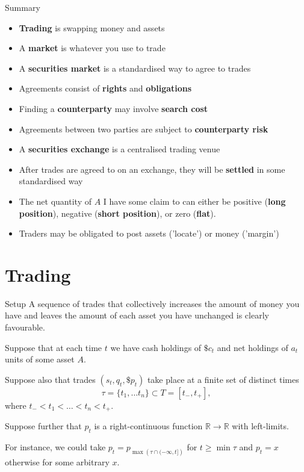 \documentclass{beamer}
\begin{document}
\begin{frame}{Summary}
	\begin{itemize}
		\item \textbf{Trading} is swapping money and assets
		\item A \textbf{market} is whatever you use to trade
		\item A \textbf{securities market} is a standardised way to agree to trades
		\item Agreements consist of \textbf{rights} and \textbf{obligations}
		\item Finding a \textbf{counterparty} may involve \textbf{search cost}
		\item Agreements between two parties are subject to \textbf{counterparty risk}
		\item A \textbf{securities exchange} is a centralised trading venue %
		\item After trades are agreed to on an exchange, they will be \textbf{settled} in some standardised way
		\item The net quantity of $A$ I have some claim to can either be positive (\textbf{long position}), negative (\textbf{short position}), or zero (\textbf{flat}).
		\item Traders may be obligated to post assets ('locate') or money ('margin')
	\end{itemize}
\end{frame}

\section{Trading}
\begin{frame}{Setup}
	A sequence of trades that collectively increases the amount of money you have and leaves the amount of each asset you have unchanged is clearly favourable.

	\pause

	Suppose that at each time $t$ we have cash holdings of $\$c_t$ and net holdings of $a_t$ units of some asset $A$.

	Suppose also that trades $(s_t, q_t, \$p_t)$ take place at a finite set of distinct times
	$$\tau = \{t_1,\ldots t_n\}\subset T = [t_-, t_+],$$
	where $t_-<t_1<\ldots<t_n<t_+$.

	\pause

	Suppose further that $p_t$ is a right-continuous function $\mathbb R\to\mathbb R$ with left-limits.

	For instance, we could take $p_t = p_{\max \left(\tau\cap (-\infty,t]\right)}$ for $t\geq \min\tau$ and $p_t=x$ otherwise for some arbitrary $x$. %

\end{frame}
\end{document}
